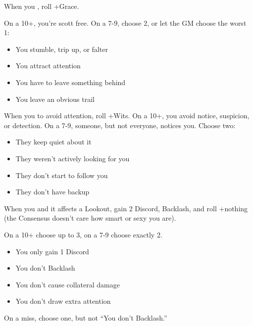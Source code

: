 \begin{multicols}{3}
  \begin{move}
    When you , roll +Grace.

    On a 10+, you're scott free. On a 7-9, choose 2, or let the GM
    choose the worst 1:
    \begin{itemize}
      \setlength\itemsep{0em}
    \item You stumble, trip up, or falter
    \item You attract attention
    \item You have to leave something behind
    \item You leave an obvious trail
    \end{itemize}
  \end{move}

  \SEPARATOR

  \begin{move}
    When you  to avoid attention, roll
    +Wits. On a 10+, you avoid notice, suspicion, or detection. On a
    7-9, someone, but not everyone, notices you. Choose two:
    \begin{itemize}
      \setlength\itemsep{0em}
    \item They keep quiet about it
    \item They weren't actively looking for you
    \item They don't start to follow you
    \item They don't have backup
    \end{itemize}
  \end{move}

  \SEPARATOR

  \begin{move}
    When you  and it affects a Lookout, gain
    2 Discord, Backlash, and roll +nothing (the Consensus doesn't care
    how smart or sexy you are).

    On a 10+ choose up to 3, on a 7-9 choose exactly 2.
    \begin{itemize}
      \setlength\itemsep{0em}
    \item You only gain 1 Discord
    \item You don't Backlash
    \item You don't cause collateral damage
    \item You don't draw extra attention
    \end{itemize}
    On a miss, choose one, but not ``You don't Backlash.''
  \end{move}


\end{multicols}

